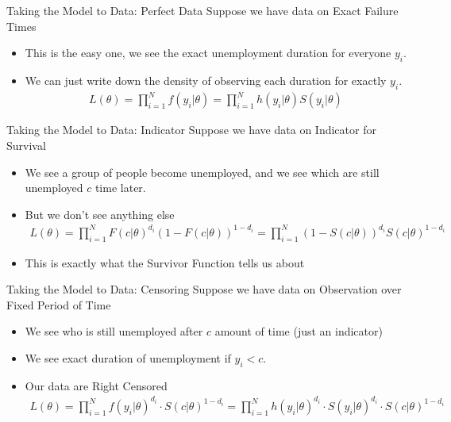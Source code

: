\documentclass[aspectratio=169]{beamer}
\begin{document}
\begin{frame}{Taking the Model to Data: Perfect Data}
Suppose we have data on \alert{Exact Failure Times}
\begin{itemize}
\item This is the easy one, we see the exact unemployment duration for everyone $y_i$.
\item We can just write down the density of observing each duration for exactly $y_i$.
\begin{align*}
L(\theta) = \prod_{i=1}^N f(y_i | \theta) = \prod_{i=1}^N h(y_i| \theta) S(y_i |\theta)
\end{align*}
\end{itemize}
\end{frame}

\begin{frame}{Taking the Model to Data: Indicator}
Suppose we have data on \alert{Indicator for Survival}
\begin{itemize}
\item We see a group of people become unemployed, and we see which are still unemployed $c$ time later.
\item But we don't see anything else
\begin{align*}
L(\theta) = \prod_{i=1}^N F(c | \theta)^{d_i} (1-F(c | \theta))^{1-d_i}  = \prod_{i=1}^N (1-S(c | \theta))^{d_i} S(c | \theta)^{1-d_i}  
\end{align*}
\item This is exactly what the Survivor Function tells us about
\end{itemize}
\end{frame}



\begin{frame}{Taking the Model to Data: Censoring}
Suppose we have data on \alert{Observation over Fixed Period of Time}
\begin{itemize}
\item We see who is still unemployed after $c$ amount of time (just an indicator)
\item We see exact duration of unemployment if $y_i < c$.
\item Our data are \alert{Right Censored}
\begin{align*}
L ( \theta ) = \prod _ { i = 1 } ^ { N } f \left( y _ { i } | \theta \right) ^ { d _ { i } } \cdot S ( c | \theta ) ^ { 1 - d _ { i } } = \prod _ { i = 1 } ^ { N } h \left( y _ { i } | \theta \right) ^ { d _ { i } } \cdot S \left( y _ { i } | \theta \right) ^ { d _ { i } } \cdot S ( c | \theta ) ^ { 1 - d _ { i } }
\end{align*}
\end{itemize}
\end{frame}
\end{document}

